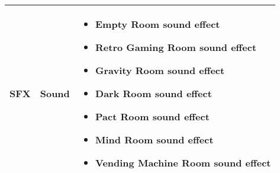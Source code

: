 \begin{tabular}{|m{3cm}|m{3cm}|m{7cm}|}
	\hline
	\textbf{SFX}& Sound & 
	\begin{itemize}
		\item Empty Room sound effect
		\item Retro Gaming Room sound effect
		\item Gravity Room sound effect
		\item Dark Room sound effect
		\item Pact Room sound effect
		\item Mind Room sound effect
		\item Vending Machine Room sound effect
     \end{itemize}\\
     \hline
\end{tabular}	